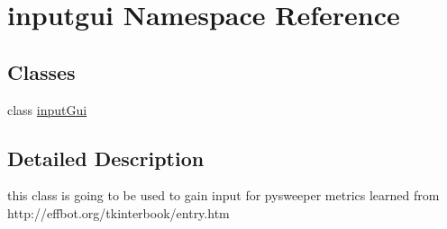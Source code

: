 \hypertarget{namespaceinputgui}{}\section{inputgui Namespace Reference}
\label{namespaceinputgui}
\subsection*{Classes}
\begin{DoxyCompactItemize}
\item 
class \mbox{\hyperlink{classinputgui_1_1input_gui}{input\+Gui}}
\end{DoxyCompactItemize}


\subsection{Detailed Description}
\begin{DoxyVerb}this class is going to be used to gain input for pysweeper metrics
learned from http://effbot.org/tkinterbook/entry.htm
\end{DoxyVerb}
 